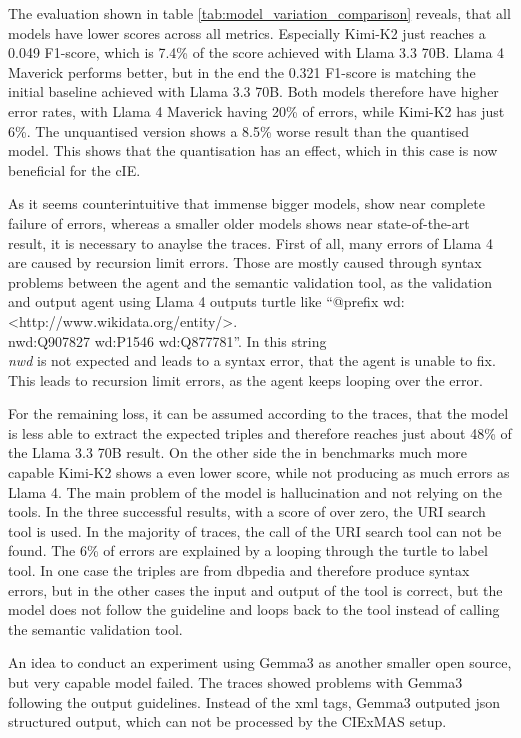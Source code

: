 \documentclass[a4paper,oneside,bibliography=totoc]{scrbook}
\begin{document}
The evaluation shown in table \ref{tab:model_variation_comparison} reveals, that all models have lower scores across all metrics. Especially Kimi-K2 just reaches a 0.049 F1-score, which is 7.4\% of the score achieved with Llama 3.3 70B. Llama 4 Maverick performs better, but in the end the 0.321 F1-score is matching the initial baseline achieved with Llama 3.3 70B. Both models therefore have higher error rates, with Llama 4 Maverick having 20\% of errors, while Kimi-K2 has just 6\%. The unquantised version shows a 8.5\% worse result than the quantised model. This shows that the quantisation has an effect, which in this case is now beneficial for the \ac{cIE}.

As it seems counterintuitive that immense bigger models, show near complete failure of errors, whereas a smaller older models shows near state-of-the-art result, it is necessary to anaylse the traces. First of all, many errors of Llama 4 are caused by recursion limit errors. Those are mostly caused through syntax problems between the agent and the semantic validation tool, as the validation and output agent using Llama 4 outputs turtle like \enquote{@prefix wd: <http://www.wikidata.org/entity/>.\\nwd:Q907827 wd:P1546 wd:Q877781}. In this string \textit{\\nwd} is not expected and leads to a syntax error, that the agent is unable to fix. This leads to recursion limit errors, as the agent keeps looping over the error.

For the remaining loss, it can be assumed according to the traces, that the model is less able to extract the expected triples and therefore reaches just about 48\% of the Llama 3.3 70B result. On the other side the in benchmarks much more capable Kimi-K2 shows a even lower score, while not producing as much errors as Llama 4. The main problem of the model is hallucination and not relying on the tools. In the three successful results, with a score of over zero, the URI search tool is used. In the majority of traces, the call of the URI search tool can not be found. The 6\% of errors are explained by a looping through the turtle to label tool. In one case the triples are from dbpedia and therefore produce syntax errors, but in the other cases the input and output of the tool is correct, but the model does not follow the guideline and loops back to the tool instead of calling the semantic validation tool.

An idea to conduct an experiment using Gemma3 as another smaller open source, but very capable model failed. The traces showed problems with Gemma3 following the output guidelines. Instead of the xml tags, Gemma3 outputed json structured output, which can not be processed by the CIExMAS setup.
\end{document}
